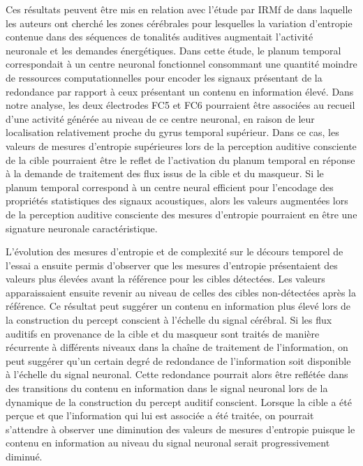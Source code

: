 Ces résultats peuvent être mis en relation avec l'étude par IRMf de \cite{overath2007information} dans laquelle les auteurs ont cherché les zones cérébrales pour lesquelles la variation d'entropie contenue dans des séquences de tonalités auditives augmentait l'activité neuronale et les demandes énergétiques. 
Dans cette étude, le planum temporal correspondait à un centre neuronal fonctionnel consommant une quantité moindre de ressources computationnelles pour encoder les signaux présentant de la redondance par rapport à ceux présentant un contenu en information élevé. 
Dans notre analyse, les deux électrodes FC5 et FC6 pourraient être associées au recueil d'une activité générée au niveau de ce centre neuronal, en raison de leur localisation relativement proche du gyrus temporal supérieur. 
Dans ce cas, les valeurs de mesures d'entropie supérieures lors de la perception auditive consciente de la cible pourraient être le reflet de l'activation du planum temporal en réponse à la demande de traitement des flux issus de la cible et du masqueur. 
Si le planum temporal correspond à un centre neural efficient pour l'encodage des propriétés statistiques des signaux acoustiques, alors les valeurs augmentées lors de la perception auditive consciente des mesures d'entropie pourraient en être une signature neuronale caractéristique. 

L'évolution des mesures d'entropie et de complexité sur le décours temporel de l'essai a ensuite permis d'observer que les mesures d'entropie présentaient des valeurs plus élevées avant la référence pour les cibles détectées. 
Les valeurs apparaissaient ensuite revenir au niveau de celles des cibles non-détectées après la référence. 
Ce résultat peut suggérer un contenu en information plus élevé lors de la construction du percept conscient à l'échelle du signal cérébral. 
Si les flux auditifs en provenance de la cible et du masqueur sont traités de manière récurrente à différents niveaux dans la chaîne de traitement de l'information, on peut suggérer qu'un certain degré de redondance de l'information soit disponible à l'échelle du signal neuronal. 
Cette redondance pourrait alors être reflétée dans des transitions du contenu en information dans le signal neuronal lors de la dynamique de la construction du percept auditif conscient. 
Lorsque la cible a été perçue et que l'information qui lui est associée a été traitée, on pourrait s'attendre à observer une diminution des valeurs de mesures d'entropie puisque le contenu en information au niveau du signal neuronal serait progressivement diminué. 


